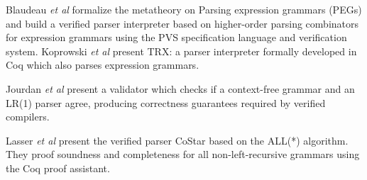 \begin{isabellebody}
\begin{isamarkuptext}
Blaudeau \textit{et al} \cite{Blaudeau:2020} formalize the metatheory on Parsing expression grammars (PEGs) and
build a verified parser interpreter based on higher-order parsing combinators for expression grammars
using the PVS specification language and verification system. Koprowski \textit{et al} \cite{Koprowski:2011}
present TRX: a parser interpreter formally developed in Coq which also parses expression grammars.

Jourdan \textit{et al} \cite{Jourdan:2012} present a validator which checks if a context-free grammar
and an LR(1) parser agree, producing correctness guarantees required by verified compilers.

Lasser \textit{et al} \cite{Lasser:2021} present the verified parser CoStar based on the ALL(*) algorithm.
They proof soundness and completeness for all non-left-recursive grammars using the Coq proof assistant.%
\end{isamarkuptext}\isamarkuptrue%
%
\isadelimdocument
%
\endisadelimdocument
%
\isatagdocument
%
\isamarkuptrue%
%
\endisatagdocument
{\isafolddocument}%
%
\isadelimdocument
%
\endisadelimdocument
%
\isadelimtheory
%
\endisadelimtheory
%
\isatagtheory
%
\endisatagtheory
{\isafoldtheory}%
%
\isadelimtheory
%
\endisadelimtheory
%
\end{isabellebody}%
\endinput
